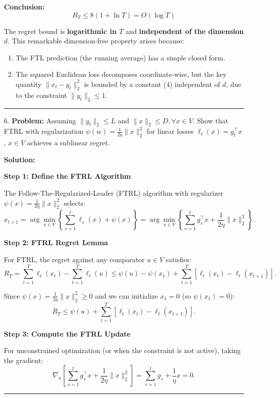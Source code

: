 \documentclass[12pt,letterpaper]{article}
\newenvironment{proof}{\noindent{\bf Proof:}}{\qed\bigskip}
\newcommand{\qed}{\rule{7pt}{7pt}}
\begin{document}
\begin{enumerate}
\begin{proof}
\bigskip

\textbf{Conclusion:}
\[
\boxed{R_T \leq 8(1 + \ln T) = O(\log T)}
\]

The regret bound is \textbf{logarithmic in $T$} and \textbf{independent of the dimension $d$}. This remarkable dimension-free property arises because:
\begin{enumerate}
    \item The FTL prediction (the running average) has a simple closed form.
    \item The squared Euclidean loss decomposes coordinate-wise, but the key quantity $\|x_t - y_t\|_2^2$ is bounded by a constant (4) independent of $d$, due to the constraint $\|y_t\|_2 \leq 1$.
\end{enumerate}

\end{proof}
        \item[6.]
        \textbf{Problem:} Assuming $\|g_t\|_2 \leq L$ and $\|x\|_2 \leq D, \forall x \in V$. Show that FTRL with regularization $\psi(w) = \frac{1}{2\eta}\|x\|_2^2$ for linear losses $\ell_t(x) = g_t^\top x$, $x \in V$ achieves a sublinear regret.

\bigskip

\textbf{Solution:}

\begin{proof}

\textbf{Step 1: Define the FTRL Algorithm}

The Follow-The-Regularized-Leader (FTRL) algorithm with regularizer $\psi(x) = \frac{1}{2\eta}\|x\|_2^2$ selects:
\[
x_{t+1} = \arg\min_{x \in V} \left\{\sum_{s=1}^{t} \ell_s(x) + \psi(x)\right\} = \arg\min_{x \in V} \left\{\sum_{s=1}^{t} g_s^\top x + \frac{1}{2\eta}\|x\|_2^2\right\}.
\]

\bigskip

\textbf{Step 2: FTRL Regret Lemma}

For FTRL, the regret against any comparator $u \in V$ satisfies:
\[
R_T = \sum_{t=1}^{T}\ell_t(x_t) - \sum_{t=1}^{T}\ell_t(u) \leq \psi(u) - \psi(x_1) + \sum_{t=1}^{T}\left[\ell_t(x_t) - \ell_t(x_{t+1})\right].
\]

Since $\psi(x) = \frac{1}{2\eta}\|x\|_2^2 \geq 0$ and we can initialize $x_1 = 0$ (so $\psi(x_1) = 0$):
\[
R_T \leq \psi(u) + \sum_{t=1}^{T}\left[\ell_t(x_t) - \ell_t(x_{t+1})\right].
\]

\bigskip

\textbf{Step 3: Compute the FTRL Update}

For unconstrained optimization (or when the constraint is not active), taking the gradient:
\[
\nabla_x \left[\sum_{s=1}^{t} g_s^\top x + \frac{1}{2\eta}\|x\|_2^2\right] = \sum_{s=1}^{t} g_s + \frac{1}{\eta}x = 0.
\]


\end{proof}
\end{enumerate}
\end{document}
